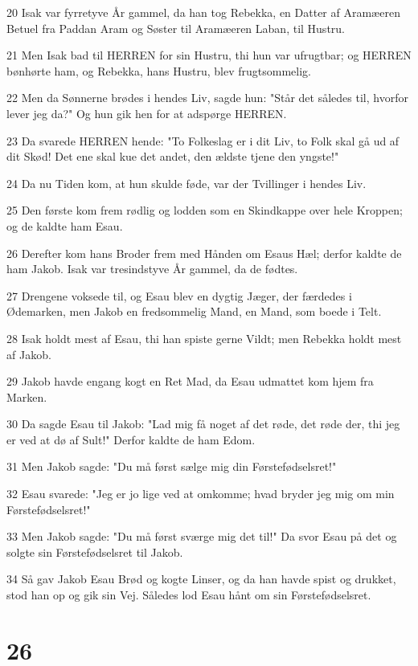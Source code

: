 \par 20 Isak var fyrretyve År gammel, da han tog Rebekka, en Datter af Aramæeren Betuel fra Paddan Aram og Søster til Aramæeren Laban, til Hustru.
\par 21 Men Isak bad til HERREN for sin Hustru, thi hun var ufrugtbar; og HERREN bønhørte ham, og Rebekka, hans Hustru, blev frugtsommelig.
\par 22 Men da Sønnerne brødes i hendes Liv, sagde hun: "Står det således til, hvorfor lever jeg da?" Og hun gik hen for at adspørge HERREN.
\par 23 Da svarede HERREN hende: "To Folkeslag er i dit Liv, to Folk skal gå ud af dit Skød! Det ene skal kue det andet, den ældste tjene den yngste!"
\par 24 Da nu Tiden kom, at hun skulde føde, var der Tvillinger i hendes Liv.
\par 25 Den første kom frem rødlig og lodden som en Skindkappe over hele Kroppen; og de kaldte ham Esau.
\par 26 Derefter kom hans Broder frem med Hånden om Esaus Hæl; derfor kaldte de ham Jakob. Isak var tresindstyve År gammel, da de fødtes.
\par 27 Drengene voksede til, og Esau blev en dygtig Jæger, der færdedes i Ødemarken, men Jakob en fredsommelig Mand, en Mand, som boede i Telt.
\par 28 Isak holdt mest af Esau, thi han spiste gerne Vildt; men Rebekka holdt mest af Jakob.
\par 29 Jakob havde engang kogt en Ret Mad, da Esau udmattet kom hjem fra Marken.
\par 30 Da sagde Esau til Jakob: "Lad mig få noget af det røde, det røde der, thi jeg er ved at dø af Sult!" Derfor kaldte de ham Edom.
\par 31 Men Jakob sagde: "Du må først sælge mig din Førstefødselsret!"
\par 32 Esau svarede: "Jeg er jo lige ved at omkomme; hvad bryder jeg mig om min Førstefødselsret!"
\par 33 Men Jakob sagde: "Du må først sværge mig det til!" Da svor Esau på det og solgte sin Førstefødselsret til Jakob.
\par 34 Så gav Jakob Esau Brød og kogte Linser, og da han havde spist og drukket, stod han op og gik sin Vej. Således lod Esau hånt om sin Førstefødselsret.

\chapter{26}

